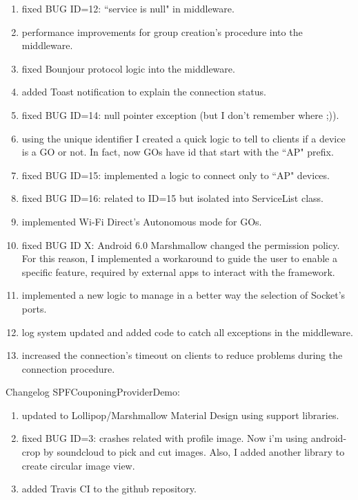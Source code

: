 \begin{enumerate}
	\item fixed BUG ID=12: ``service is null" in middleware.
	\item performance improvements for group creation's procedure into the middleware.
	\item fixed Bounjour protocol logic into the middleware.
	\item added Toast notification to explain the connection status.
	\item fixed BUG ID=14: null pointer exception (but I don't remember where ;)).
	\item using the unique identifier I created a quick logic to tell to clients if a device is a GO or not. In fact, now GOs have id that start with the ``AP" prefix.
	\item fixed BUG ID=15: implemented a logic to connect only to ``AP" devices.
	\item fixed BUG ID=16: related to ID=15 but isolated into ServiceList class.
	\item implemented Wi-Fi Direct's Autonomous mode for GOs.
	\item fixed BUG ID X: Android 6.0 Marshmallow changed the permission policy. For this reason, I implemented a workaround to guide the user to enable a specific feature, required by external apps to interact with the framework.
	\item implemented a new logic to manage in a better way the selection of Socket's ports.
	\item log system updated and added code to catch all exceptions in the middleware.
	\item increased the connection's timeout on clients to reduce problems during the connection procedure.
\end{enumerate} 

Changelog SPFCouponingProviderDemo:
\begin{enumerate}
	\item updated to Lollipop/Marshmallow Material Design using support libraries.
	\item fixed BUG ID=3: crashes related with profile image. Now i'm using android-crop by soundcloud to pick and cut images. Also, I added another library to create circular image view.	
	\item added Travis CI to the github repository.
\end{enumerate}

